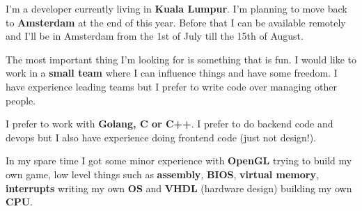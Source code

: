 

\begin{cvparagraph}
	I'm a developer currently living in \textbf{Kuala Lumpur}. I'm planning to move back to \textbf{Amsterdam} at the end of this year. Before that I can be available remotely and I'll be in Amsterdam from the 1st of July till the 15th of August.

	The most important thing I'm looking for is something that is fun. I would like to work in a \textbf{small team} where I can influence things and have some freedom. I have experience leading teams but I prefer to write code over managing other people.

	I prefer to work with \textbf{Golang, C or C++}. I prefer to do backend code and devops but I also have experience doing frontend code (just not design!).

	In my spare time I got some minor experience with \textbf{OpenGL} trying to build my own game, low level things such as \textbf{assembly}, \textbf{BIOS}, \textbf{virtual memory}, \textbf{interrupts} writing my own \textbf{OS} and \textbf{VHDL} (hardware design) building my own \textbf{CPU}.
\end{cvparagraph}
